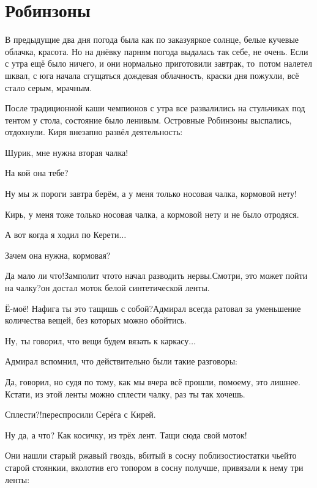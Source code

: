 \chapter{Робинзоны}
\vepsianrose

В предыдущие два дня погода была как по заказу\mdash яркое солнце, белые кучевые облачка, красота. Но на днёвку парням погода выдалась так себе, не очень. Если с утра ещё было ничего, и они нормально приготовили завтрак, то~потом налетел шквал, с юга начала сгущаться дождевая облачность, краски дня пожухли, всё стало серым, мрачным.

После традиционной каши чемпионов с утра все развалились на стульчиках под тентом у стола, состояние было ленивым. Островные Робинзоны выспались, отдохнули. Киря внезапно развёл деятельность:

\diagdash Шурик, мне нужна вторая чалка!

\diagdash На кой она тебе?

\diagdash Ну мы ж пороги завтра берём, а у меня только носовая чалка, кормовой нету!

\diagdash Кирь, у меня тоже только носовая чалка, а кормовой нету и не было отродяся.

\diagdash А вот когда я ходил по Керети$\ldots$

\diagdash Зачем она нужна, кормовая?

\diagdash Да мало ли что!\mdash Замполит что\sdash то начал разводить нервы.\mdash Смотри, это может пойти на чалку?\mdash он достал моток белой синтетической ленты.

\diagdash Ё-моё! Нафига ты это тащишь с собой?\mdash Адмирал всегда ратовал за уменьшение количества вещей, без которых можно обойтись.

\diagdash Ну, ты говорил, что вещи будем вязать к каркасу$\ldots$

Адмирал вспомнил, что действительно были такие разговоры:

\diagdash Да, говорил, но судя по тому, как мы вчера всё прошли, по\sdash моему, это лишнее. Кстати, из этой ленты можно сплести чалку, раз ты так хочешь.

\diagdash Сплести?!\mdash переспросили Серёга с Кирей.

\diagdash Ну да, а что? Как косичку, из трёх лент. Тащи сюда свой моток!

Они нашли старый ржавый гвоздь, вбитый в сосну поблизости\mdash остатки чьей\sdash то старой стоянки\mdash и, вколотив его топором в сосну получше, привязали к нему три ленты:

